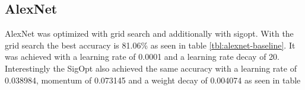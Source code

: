 \subsection{AlexNet}

AlexNet was optimized with grid search and additionally with sigopt. With the grid search the best accuracy is 81.06\% as seen in table \ref{tbl:alexnet-baseline}. It was achieved with a learning rate of 0.0001 and a learning rate decay of 20. Interestingly the SigOpt also achieved the same accuracy with a learning rate of 0.038984, momentum of 0.073145 and a weight decay of 0.004074 as seen in table 


\begin{table*}[t]
    \caption{Accuracy (\%) for several learning rates and lr-decays for AlexNet as a baseline.}
    \centering
    \begin{small}
	\textsc{
	}
    \end{small}
    \vspace{-3.9mm}
    \label{tbl:alexnet-baseline}
\end{table*}


